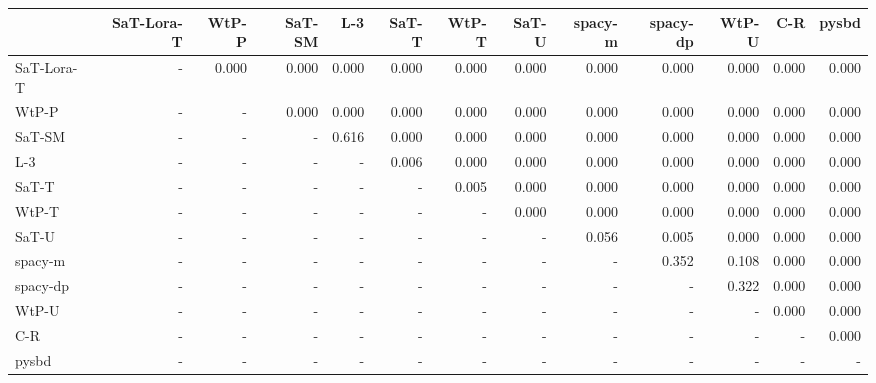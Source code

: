 \begin{tabular}{lrrrrrrrrrrrr}
\toprule
 & SaT-Lora-T & WtP-P & SaT-SM & L-3 & SaT-T & WtP-T & SaT-U & spacy-m & spacy-dp & WtP-U & C-R & pysbd \\
\midrule
SaT-Lora-T & - & 0.000 & 0.000 & 0.000 & 0.000 & 0.000 & 0.000 & 0.000 & 0.000 & 0.000 & 0.000 & 0.000 \\
WtP-P & - & - & 0.000 & 0.000 & 0.000 & 0.000 & 0.000 & 0.000 & 0.000 & 0.000 & 0.000 & 0.000 \\
SaT-SM & - & - & - & 0.616 & 0.000 & 0.000 & 0.000 & 0.000 & 0.000 & 0.000 & 0.000 & 0.000 \\
L-3 & - & - & - & - & 0.006 & 0.000 & 0.000 & 0.000 & 0.000 & 0.000 & 0.000 & 0.000 \\
SaT-T & - & - & - & - & - & 0.005 & 0.000 & 0.000 & 0.000 & 0.000 & 0.000 & 0.000 \\
WtP-T & - & - & - & - & - & - & 0.000 & 0.000 & 0.000 & 0.000 & 0.000 & 0.000 \\
SaT-U & - & - & - & - & - & - & - & 0.056 & 0.005 & 0.000 & 0.000 & 0.000 \\
spacy-m & - & - & - & - & - & - & - & - & 0.352 & 0.108 & 0.000 & 0.000 \\
spacy-dp & - & - & - & - & - & - & - & - & - & 0.322 & 0.000 & 0.000 \\
WtP-U & - & - & - & - & - & - & - & - & - & - & 0.000 & 0.000 \\
C-R & - & - & - & - & - & - & - & - & - & - & - & 0.000 \\
pysbd & - & - & - & - & - & - & - & - & - & - & - & - \\
\bottomrule
\end{tabular}

